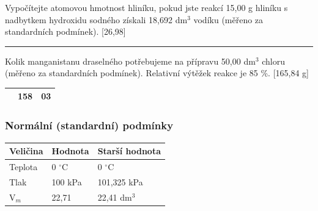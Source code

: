 Vypočítejte atomovou hmotnost hliníku, pokud jste reakcí 15,00 g hliníku s nadbytkem hydroxidu sodného získali 18,692 dm$^3$ vodíku (měřeno za standardních podmínek). [26,98]


\hrule

Kolik manganistanu draselného potřebujeme na přípravu 50,00 dm$^3$ chloru (měřeno za standardních podmínek). Relativní výtěžek reakce je 85 \%. [165,84 g]


\begin{tabular}{|l|r@{,}l|}
	\hline
	\ce{KMnO4} & 158 & 03 \\\hline
\end{tabular}

\subsubsection{Normální (standardní) podmínky}

\begin{tabular}{|l|l|l|}
	\hline
	\textbf{Veličina} & \textbf{Hodnota} & \textbf{Starší hodnota} \\\hline
	Teplota & 0 $^\circ$C & 0 $^\circ$C \\\hline
	Tlak & 100 kPa & 101,325 kPa \\\hline
	V$_m$ & 22,71 & 22,41 dm$^3$ \\\hline
\end{tabular}